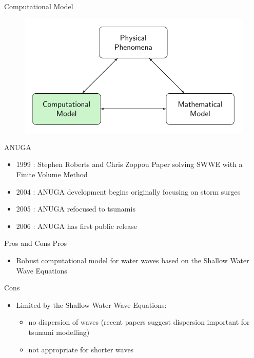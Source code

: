 \documentclass[handout]{beamer}
\begin{document}
\begin{frame}{Computational Model}
		\begin{figure}
			\includegraphics[width=\textwidth]{./Pics/ModelDiagrams/FlowChartHigh3G.pdf}
		\end{figure}
\end{frame}

\begin{frame}{ANUGA}
	\begin{itemize}
		\item 1999 : Stephen Roberts and Chris Zoppou Paper solving SWWE with a Finite Volume Method
		\item 2004 : ANUGA development begins originally focusing on storm surges
		\item 2005 : ANUGA refocused to tsunamis
		\item 2006 : ANUGA has first public release
	\end{itemize}
\end{frame}


\begin{frame}{Pros and Cons}
	Pros
	\begin{itemize}
	\item Robust computational model for water waves based on the Shallow Water Wave Equations
	\end{itemize}
	\pause
	Cons
	\begin{itemize}
	\item Limited by the Shallow Water Wave Equations:
	\begin{itemize}
		\item no dispersion of waves (recent papers suggest dispersion important for tsunami modelling)
		\item not appropriate for shorter waves
	\end{itemize}
	\end{itemize}
\end{frame}
\end{document}
